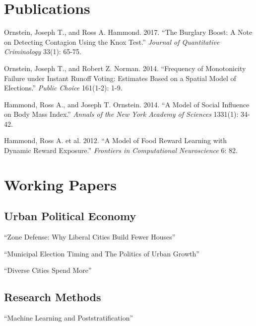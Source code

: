\documentclass[letterpaper]{article}
\renewenvironment{itemize}{
  \begin{list}{}{
    \setlength{\leftmargin}{1.5em}
  }
}{
  \end{list}
}
\begin{document}
\hrulefill

\section*{Publications}
\begin{itemize}
\item Ornstein, Joseph T., and Ross A. Hammond. 2017. ``The Burglary Boost: A Note on Detecting Contagion Using the Knox Test.'' \textit{Journal of Quantitative Criminology} 33(1): 65-75.
\item Ornstein, Joseph T., and Robert Z. Norman. 2014. ``Frequency of Monotonicity Failure under Instant Runoff Voting: Estimates Based on a Spatial Model of Elections.'' \textit{Public Choice} 161(1-2): 1-9.
\item Hammond, Ross A., and Joseph T. Ornstein. 2014. ``A Model of Social Influence on Body Mass Index.'' \textit{Annals of the New York Academy of Sciences} 1331(1): 34-42.
\item Hammond, Ross A. et al. 2012. ``A Model of Food Reward Learning with Dynamic Reward Exposure.'' \textit{Frontiers in Computational Neuroscience} 6: 82.
\end{itemize}

\hrulefill

\section*{Working Papers}

\subsection*{Urban Political Economy}
\begin{itemize}
\item ``Zone Defense: Why Liberal Cities Build Fewer Houses''  
\item ``Municipal Election Timing and The Politics of Urban Growth'' 
\item ``Diverse Cities Spend More'' 
\end{itemize}

\subsection*{Research Methods}
\begin{itemize}
\item ``Machine Learning and Poststratification'' 
\end{itemize}
\end{document}
